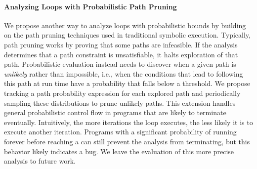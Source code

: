 \paragraph{Analyzing Loops with Probabilistic Path Pruning}
We propose another way to analyze loops with probabilistic bounds by
building on the path pruning techniques used in traditional symbolic
execution.  Typically, path pruning works by proving that some paths
are infeasible. If the analysis determines that a path constraint
is unsatisfiable, it halts exploration of that path.  Probabilistic evaluation
instead needs to discover when a given path is \emph{unlikely} rather
than impossible, i.e., when the conditions that lead to following this
path at run time have a probability that falls below a
threshold.  We propose tracking a path probability expression for each
explored path and periodically sampling these distributions to
prune unlikely paths.
This extension handles general probabilistic
control flow in programs that are likely to terminate eventually.
Intuitively, the more iterations the loop
executes, the less likely it is to execute another iteration.
Programs with a significant probability of running forever before
reaching a \passert can still prevent the analysis from terminating,
but this behavior likely indicates a bug.
We leave the evaluation of
this more precise analysis to future work.






